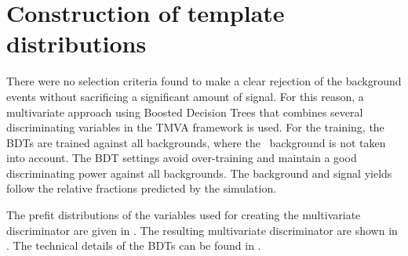 \section{Construction of template distributions}
There were no selection criteria found to make a clear rejection of the background events without sacrificing a significant amount of signal. For this reason, a multivariate approach using Boosted Decision Trees that combines several discriminating variables in the TMVA framework is used. For the training, the BDTs are trained against all backgrounds, where the \NPL\ background is not taken into account. The BDT settings  avoid over-training and  maintain a good discriminating power against all backgrounds. The background and signal yields follow the relative fractions predicted by the simulation. 



The prefit distributions of the variables used for creating the multivariate discriminator are given in . The resulting multivariate discriminator are shown in .  The technical details of the BDTs can be found in .

